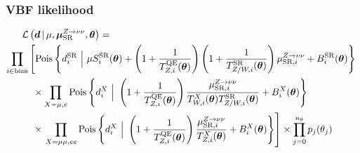 \documentclass[aspectratio=169,xcolor=dvipsnames,,table,compress]{beamer}
\begin{document}
\begin{frame} \frametitle{VBF likelihood}
  \vspace{-5mm}
  \begin{align*}
      \mathcal{L}\left(\bm{d}\,|\, \mu,\muz,\bm{\theta}\right) = \hspace{-30mm} & \nonumber \\
      \prod_{i\in\mathrm{bins}} & \left[
      \pois\left\{d^{\mathrm{SR}}_{i} ~\Big|~ \mu S^{\mathrm{SR}}_{i}(\bm\theta)  + \left(1+\frac{1}{\Ti{\mathrm{QE}}{Z}(\bm\theta)}\right)\left(1+\frac{1}{\Ti{\mathrm{SR}}{Z/W}(\bm\theta)}\right)\muzi + B^{\mathrm{SR}}_{i}(\bm\theta)\right\} \vphantom{\frac{\muzi}{\Ti{\mu\mu}{Z}(\bm\theta)}}\right. \nonumber \\
      & \phantom{\Big[} \times \prod_{X=\mu,e} \pois\left\{d^{X}_i~\Big|~ \left(1+\frac{1}{\Ti{\mathrm{QE}}{Z}(\bm\theta)}\right)\frac{\muzi}{\Ti{X}{W}(\bm\theta)\Ti{\mathrm{SR}}{Z/W}(\bm\theta)} + B^{X}_i(\bm\theta) \right\} \nonumber \\
      & \phantom{\Big[} \times \left.\prod_{X=\mu\mu,ee} \pois\left\{d^{X}_i~\Big|~ \left(1+\frac{1}{\Ti{\mathrm{QE}}{Z}(\bm\theta)}\right)\frac{\muzi}{\Ti{X}{Z}(\bm\theta)} + B^{X}_i(\bm\theta) \right\} \right]  \times  \prod_{j=0}^{n_\theta} p_j(\theta_j)
  \end{align*}
\end{frame}
\end{document}
